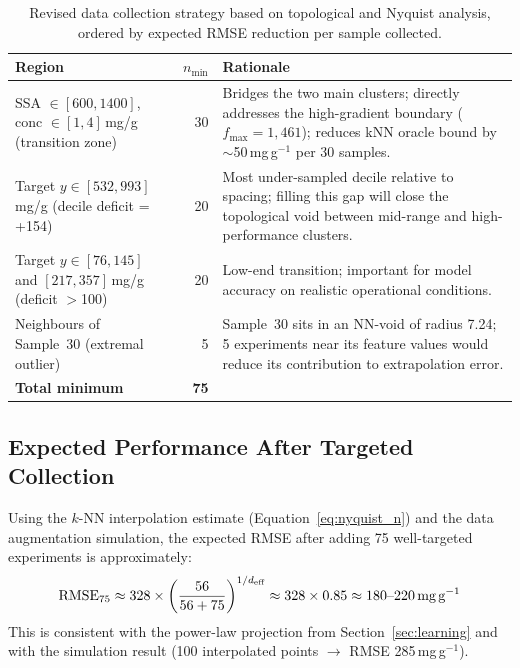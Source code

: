 \documentclass[12pt,a4paper]{article}
\begin{document}
\begin{table}[h]
\centering
\caption{Revised data collection strategy based on topological and Nyquist
  analysis, ordered by expected RMSE reduction per sample collected.}
\label{tab:recommendations}
\small
\begin{tabular}{p{4.5cm}rp{7cm}}
\toprule
Region & $n_\text{min}$ & Rationale \\
\midrule
SSA $\in [600,1400]$, conc $\in [1,4]$\,mg/g (transition zone) &
30 &
Bridges the two main clusters; directly addresses the high-gradient
boundary ($f_\text{max}=1{,}461$); reduces kNN oracle bound by
$\sim$50\,mg\,g$^{-1}$ per 30 samples. \\
\addlinespace
Target $y \in [532,993]$\,mg/g (decile deficit = +154) &
20 &
Most under-sampled decile relative to spacing; filling this
gap will close the topological void between mid-range and
high-performance clusters. \\
\addlinespace
Target $y \in [76,145]$ and $[217,357]$\,mg/g (deficit $>$100) &
20 &
Low-end transition; important for model accuracy on
realistic operational conditions. \\
\addlinespace
Neighbours of Sample~30 (extremal outlier) &
5  &
Sample~30 sits in an NN-void of radius 7.24; 5 experiments
near its feature values would reduce its contribution to
extrapolation error. \\
\midrule
\textbf{Total minimum} & \textbf{75} & \\
\bottomrule
\end{tabular}
\end{table}

\subsection{Expected Performance After Targeted Collection}

Using the $k$-NN interpolation estimate (Equation~\ref{eq:nyquist_n}) and
the data augmentation simulation, the expected RMSE after adding 75
well-targeted experiments is approximately:
\begin{equation}
  \text{RMSE}_{75} \approx 328 \times \left(\frac{56}{56+75}\right)^{1/d_{\text{eff}}} \approx
  328 \times 0.85 \approx 180\text{--}220\,\text{mg\,g}^{-1}
\end{equation}
This is consistent with the power-law projection from Section~\ref{sec:learning}
and with the simulation result (100 interpolated points $\to$ RMSE 285\,mg\,g$^{-1}$).

%
%
\end{document}
